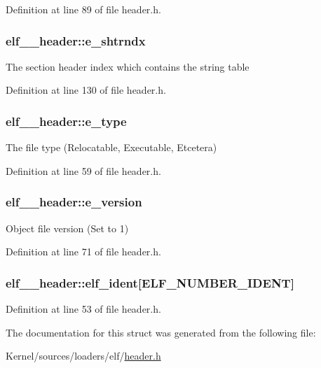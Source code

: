 Definition at line 89 of file header.h.

\hypertarget{structelf__32__header_a4c98bca5dcfaea4cb18b26ba8942af72}{
\subsubsection[{e\_\-shtrndx}]{ {\bf elf\_\_\-header::e\_\-shtrndx}}}
\label{structelf__32__header_a4c98bca5dcfaea4cb18b26ba8942af72}
The section header index which contains the string table 

Definition at line 130 of file header.h.

\hypertarget{structelf__32__header_a9b5c0b9a83cd0c472290a81676b4119f}{
\subsubsection[{e\_\-type}]{ {\bf elf\_\_\-header::e\_\-type}}}
\label{structelf__32__header_a9b5c0b9a83cd0c472290a81676b4119f}
The file type (Relocatable, Executable, Etcetera) 

Definition at line 59 of file header.h.

\hypertarget{structelf__32__header_ab8b2dd687058469e74ec1cda4e924add}{
\subsubsection[{e\_\-version}]{ {\bf elf\_\_\-header::e\_\-version}}}
\label{structelf__32__header_ab8b2dd687058469e74ec1cda4e924add}
Object file version (Set to 1) 

Definition at line 71 of file header.h.

\hypertarget{structelf__32__header_ad6b49380ff71793547a712aa8d24c5fe}{
\subsubsection[{elf\_\-ident}]{ {\bf elf\_\_\-header::elf\_\-ident}\mbox{[}ELF\_\-NUMBER\_\-IDENT\mbox{]}}}
\label{structelf__32__header_ad6b49380ff71793547a712aa8d24c5fe}


Definition at line 53 of file header.h.



The documentation for this struct was generated from the following file:\begin{DoxyCompactItemize}
\item 
Kernel/sources/loaders/elf/\hyperlink{header_8h}{header.h}\end{DoxyCompactItemize}
